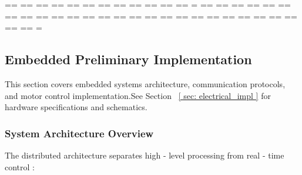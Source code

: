     == == == == == == == == == == == ==
    = %
      == == == == == == == == == == == == == == == == == == == == == == == == ==
      == ==
    =

\subsection {
  Embedded Preliminary Implementation
}
\label {
sec:
  embedded_impl
}

This section covers embedded systems architecture,
    communication protocols,
    and motor control implementation.See Section ~\ref {
sec:
  electrical_impl
} for
  hardware specifications and schematics.

\subsubsection{System Architecture Overview}

      The distributed architecture separates high -
      level processing from real -
      time control :

